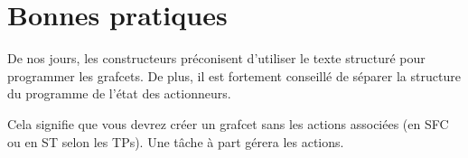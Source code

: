\section{Bonnes pratiques}
  De nos jours, les constructeurs préconisent d'utiliser le texte structuré pour programmer les grafcets. De plus, il est fortement conseillé de séparer la structure du programme de l'état des actionneurs.

  Cela signifie que vous devrez créer un grafcet sans les actions associées (en SFC ou en ST selon les TPs). Une tâche à part gérera les actions. 
